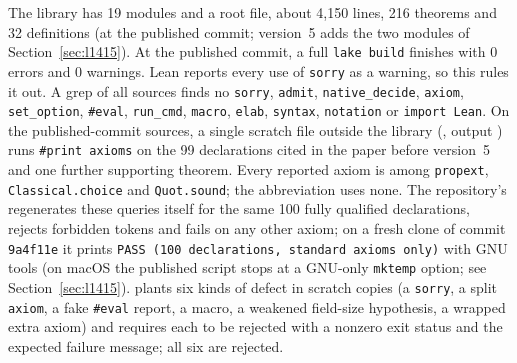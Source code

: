 \documentclass[11pt]{article}
\theoremstyle{definition}
\theoremstyle{remark}
\newcommand{\lean}[1]{\texttt{#1}}
\newcommand{\shortcommit}{9a4f11e}
\begin{document}
The library has 19 modules and a root file, about 4{,}150 lines, 216 theorems and 32
definitions (at the published commit; version~5 adds the two modules of Section~\ref{sec:l1415}). At the published commit, a full \lean{lake build} finishes with 0 errors and 0 warnings. Lean reports every
use of \lean{sorry} as a warning, so this rules it out. A grep of all sources finds no
\lean{sorry}, \lean{admit}, \lean{native\_decide}, \lean{axiom}, \lean{set\_option},
\lean{\#eval}, \lean{run\_cmd}, \lean{macro}, \lean{elab}, \lean{syntax}, \lean{notation} or
\lean{import Lean}. On the published-commit sources, a single scratch file outside the library
(, output ) runs \lean{\#print axioms}
on the 99 declarations cited in the paper before version~5 and one further supporting theorem. Every reported
axiom is among \lean{propext}, \lean{Classical.choice} and \lean{Quot.sound}; the abbreviation
 uses none. The repository's  regenerates these queries itself for the same 100 fully qualified
declarations, rejects forbidden tokens and fails on any other axiom; on a fresh clone of commit
\texttt{\shortcommit} it prints \texttt{PASS (100 declarations, standard axioms only)} with GNU
tools (on macOS the published script stops at a GNU-only \lean{mktemp} option; see
Section~\ref{sec:l1415}).
 plants six kinds of defect in scratch copies (a \lean{sorry}, a split
\lean{axiom}, a fake \lean{\#eval} report, a macro, a weakened field-size hypothesis, a wrapped
extra axiom) and requires each to be rejected with a nonzero exit status and the expected failure
message; all six are rejected.
\end{document}
